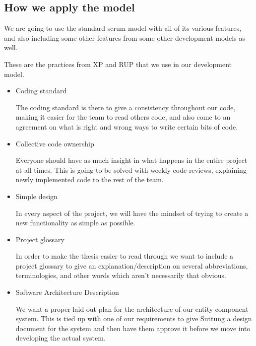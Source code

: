 \subsection{How we apply the model}

We are going to use the standard scrum model with all of its various features, and also including some other features from some other development models as well.


These are the practices from XP and RUP that we use in our development model. 
\begin{itemize}

    \item Coding standard


    The coding standard is there to give a consistency throughout our code, making it easier for the team to read others code, and also come to an agreement on what is right and wrong ways to write certain bits of code.


    \item Collective code ownership


    Everyone should have as much insight in what happens in the entire project at all times.
    This is going to be solved with weekly code reviews, explaining newly implemented code to the rest of the team.


    \item Simple design


    In every aspect of the project, we will have the mindset of trying to create a new functionality as simple as possible. 


    \item Project glossary


    In order to make the thesis easier to read through we want to include a project glossary to give an explanation/description on several abbreviations, terminologies, and other words which aren't necessarily that obvious.


    \item Software Architecture Description


     We want a proper laid out plan for the architecture of our entity component system. This is tied up with one of our requirements to give Suttung a design document for the system and then have them approve it before we move into developing the actual system.

\end{itemize}

